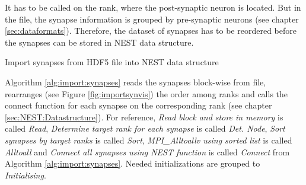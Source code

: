 It has to be called on the rank, where the post-synaptic neuron is located.
But in the file, the synapse information is grouped by pre-synaptic neurons (see chapter \ref{sec:dataformats}).
Therefore, the dataset of synapses has to be reordered before the synapses can be stored in NEST data structure.
\begin{algorithm}[ht!]
	\caption{Import synapses from HDF5 file into NEST data structure}
\label{alg:import:synapses}
\end{algorithm}

Algorithm \ref{alg:import:synapses} reads the synapses block-wise from file, rearranges (see Figure \ref{fig:importsynvis}) the order
among ranks and calls the connect function for each synapse on the corresponding rank (see chapter \ref{sec:NEST:Datastructure}).
For reference, \emph{Read block and store in memory} is called \emph{Read}, \emph{Determine target rank for each synapse} is called
\emph{Det. Node}, \emph{Sort synapses by target ranks} is called \emph{Sort}, \emph{MPI\_Alltoallv using sorted list} is called \emph{Alltoall}
and \emph{Connect all synapses using NEST function} is called \emph{Connect} from Algorithm \ref{alg:import:synapses}.
Needed initializations are grouped to \emph{Initialising}.

